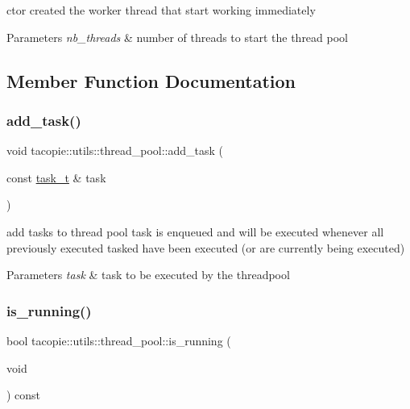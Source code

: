 ctor created the worker thread that start working immediately


\begin{DoxyParams}{Parameters}
{\em nb\+\_\+threads} & number of threads to start the thread pool \\
\hline
\end{DoxyParams}


\subsection{Member Function Documentation}
\mbox{\label{classtacopie_1_1utils_1_1thread__pool_a450bee2b7b2cd0aa0bc3935c8adc9ace}} 
\subsubsection{\texorpdfstring{add\+\_\+task()}{add\_task()}}
{\footnotesize\ttfamily void tacopie\+::utils\+::thread\+\_\+pool\+::add\+\_\+task (\begin{DoxyParamCaption}\item[{const \hyperlink{classtacopie_1_1utils_1_1thread__pool_a8ae8886fdeaa8e5c0abad12626a47296}{task\+\_\+t} \&}]{task }\end{DoxyParamCaption})}

add tasks to thread pool task is enqueued and will be executed whenever all previously executed tasked have been executed (or are currently being executed)


\begin{DoxyParams}{Parameters}
{\em task} & task to be executed by the threadpool \\
\hline
\end{DoxyParams}
\mbox{\label{classtacopie_1_1utils_1_1thread__pool_a77a647a75be188a5c5f83b922c061107}} 
\subsubsection{\texorpdfstring{is\+\_\+running()}{is\_running()}}
{\footnotesize\ttfamily bool tacopie\+::utils\+::thread\+\_\+pool\+::is\+\_\+running (\begin{DoxyParamCaption}\item[{void}]{ }\end{DoxyParamCaption}) const}


